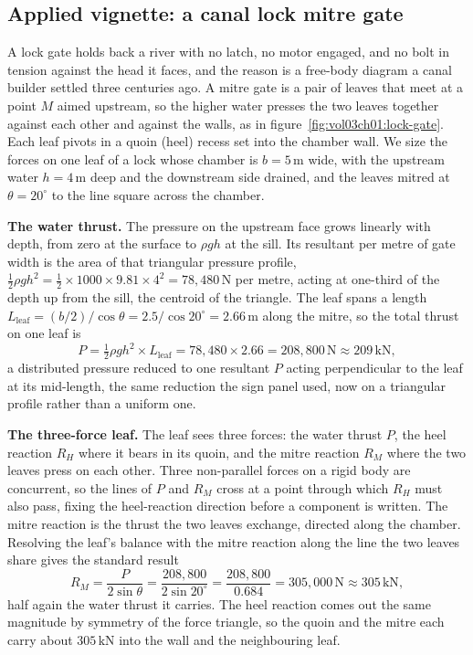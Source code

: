 \subsection{Applied vignette: a canal lock mitre gate}



A lock gate holds back a river with no latch, no motor engaged, and no bolt in
tension against the head it faces, and the reason is a free-body diagram a canal
builder settled three centuries ago. A mitre gate is a pair of leaves that meet
at a point $M$ aimed upstream, so the higher water presses the two leaves
together against each other and against the walls, as in
figure~\ref{fig:vol03ch01:lock-gate}. Each leaf pivots in a quoin (heel) recess
set into the chamber wall. We size the forces on one leaf of a lock whose
chamber is $b = 5\,\si{\meter}$ wide, with the upstream water $h = 4\,\si{
\meter}$ deep and the downstream side drained, and the leaves mitred at
$\theta = 20^{\circ}$ to the line square across the chamber.

\textbf{The water thrust.} The pressure on the upstream face grows linearly with
depth, from zero at the surface to $\rho g h$ at the sill. Its resultant per
metre of gate width is the area of that triangular pressure profile, $\tfrac{1}{2}
\rho g h^2 = \tfrac{1}{2} \times 1000 \times 9.81 \times 4^2 = 78{,}480\,\text{N}$
per metre, acting at one-third of the depth up from the sill, the centroid of the
triangle. The leaf spans a length $L_{\text{leaf}} = (b/2)/\cos\theta = 2.5/\cos
20^{\circ} = 2.66\,\si{\meter}$ along the mitre, so the total thrust on one leaf
is
\[
P = \tfrac{1}{2}\rho g h^2 \times L_{\text{leaf}}
= 78{,}480 \times 2.66 = 208{,}800\,\text{N} \approx 209\,\text{kN},
\]
a distributed pressure reduced to one resultant $P$ acting perpendicular to the
leaf at its mid-length, the same reduction the sign panel used, now on a
triangular profile rather than a uniform one.

\textbf{The three-force leaf.} The leaf sees three forces: the water thrust $P$,
the heel reaction $R_H$ where it bears in its quoin, and the mitre reaction
$R_M$ where the two leaves press on each other. Three non-parallel forces on a
rigid body are concurrent, so the lines of $P$ and $R_M$ cross at a point through
which $R_H$ must also pass, fixing the heel-reaction direction before a component
is written. The mitre reaction is the thrust the two leaves exchange, directed
along the chamber. Resolving the leaf's balance with the mitre reaction along the
line the two leaves share gives the standard result
\[
R_M = \frac{P}{2\sin\theta} = \frac{208{,}800}{2\sin 20^{\circ}}
= \frac{208{,}800}{0.684} = 305{,}000\,\text{N} \approx 305\,\text{kN},
\]
half again the water thrust it carries. The heel reaction comes out the same
magnitude by symmetry of the force triangle, so the quoin and the mitre each
carry about $305\,\text{kN}$ into the wall and the neighbouring leaf.

